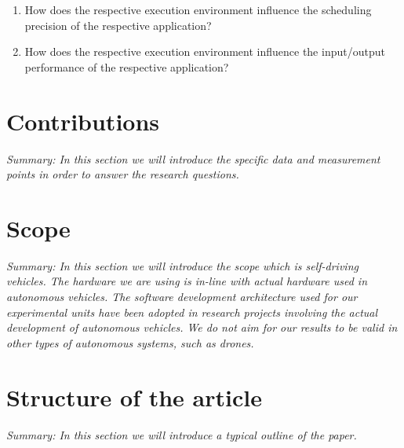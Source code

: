 \begin{enumerate}[label=\textbf{RQ\arabic*}]
\label{section:rqs}
	\item How does the respective execution environment influence the scheduling precision of the respective application?
	\item How does the respective execution environment influence the input/output performance of the respective application?\\
\end{enumerate}


\section{Contributions}
\textit{Summary: In this section we will introduce the specific data and measurement points in order to answer the research questions.} 


\section{Scope}
\textit{Summary: In this section we will introduce the scope which is self-driving vehicles. The hardware we are using is in-line with actual hardware used in autonomous vehicles. The software development architecture used for our experimental units have been adopted in research projects involving the actual development of autonomous vehicles. We do not aim for our results to be valid in other types of autonomous systems, such as drones. }

\section{Structure of the article}

\textit{Summary: In this section we will introduce a typical outline of the paper.}


	